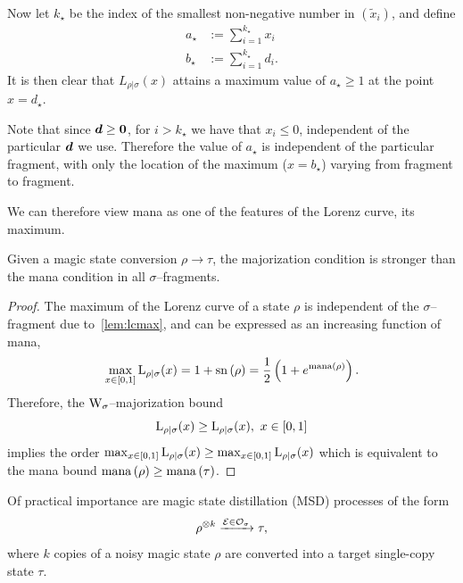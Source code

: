 \documentclass[pra,
aps,
twocolumn,
superscriptaddress,
groupedaddress,
nofootinbib,
reprint
]{revtex4-1}
\begin{document}
Now let $k_\star$ be the index of the smallest non-negative number in $(\tilde{x}_i)$, and define 
\begin{align}
a_\star &:= \sum_{i=1}^{k_\star} x_i\\
b_\star &:= \sum_{i=1}^{k_\star} d_i.
\end{align}
It is then clear that $L_{\rho|\sigma}(x)$ attains a maximum value of $a_\star \ge 1$ at the point $x = d_\star$.

Note that since $\bm{d} \ge \mathbf{0}$, for $i > k_\star$ we have that $x_i \le 0$, independent of the particular $\bm{d}$ we use. Therefore the value of $a_\star$ is independent of the particular fragment, with only the location of the maximum ($x=b_\star$) varying from fragment to fragment. 

We can therefore view mana as one of the features of the Lorenz curve, its maximum.
\begin{theorem}\label{thm:bounds}
    Given a magic state conversion $\rho \longrightarrow \tau$, the majorization condition is stronger than the mana condition in all $\sigma$--fragments.
\end{theorem}
\begin{proof}
    The maximum of the Lorenz curve of a state $\rho$ is independent of the $\sigma$--fragment due to~\cref{lem:lcmax}, and can be expressed as an increasing function of mana,
    \begin{equation}
        \max_{x\in[0,1]}{{{\rm{L}}_{\rho|\sigma}}(x)} = 1 + {{\rm{sn}}\left(\rho\right)} = \frac{1}{2} \left( 1 + e^{{\rm{mana}}\left(\rho\right)} \right).
    \end{equation}
    Therefore, the $\W{\sigma}$--majorization bound
    \begin{equation}
    	\lc{\rho}{\sigma}(x) \geq \lc{\rho}{\sigma}(x),\ x\in[0,1]
    \end{equation}
    implies the order $\max_{x\in[0,1]}{{{\rm{L}}_{\rho|\sigma}}(x)} \geq \max_{x\in[0,1]}{{{\rm{L}}_{\rho|\sigma}}(x)}$ which is equivalent to the mana bound ${{\rm{mana}}\left(\rho\right)} \geq {{\rm{mana}}\left(\tau\right)}$.
\end{proof}

Of practical importance are magic state distillation (MSD) processes of the form
\begin{equation}\label{eq:distprocess}
    \rho^{\otimes k} \xrightarrow{\mathcal{E} \in \mathcal{O}_\sigma} \tau,
\end{equation}
where $k$ copies of a noisy magic state $\rho$ are converted into a target single-copy state $\tau$. 
\end{document}
